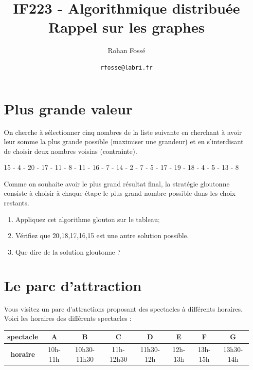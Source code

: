 \documentclass{article}[12pt]
\title{IF223 - Algorithmique distribuée\\ Rappel sur les graphes}
\date{\texttt{rfosse@labri.fr}}
\author{Rohan Fossé}
\begin{document}
\maketitle{}

\section*{Plus grande valeur}

On cherche à sélectionner cinq nombres de la liste suivante en cherchant à avoir leur somme la plus grande possible (maximiser une grandeur) et en s'interdisant de choisir deux nombres voisins (contrainte).\\

\begin{center}
  15 - 4 - 20 - 17 - 11 - 8 - 11 - 16 - 7 - 14 - 2 - 7 - 5 - 17 - 19 - 18 - 4 - 5 - 13 - 8\\  
\end{center}


Comme on souhaite avoir le plus grand résultat final, la stratégie gloutonne consiste à choisir à chaque étape le plus grand nombre possible dans les choix restants.
\begin{enumerate}
    \item Appliquez cet algorithme glouton sur le tableau;
    \item Vérifiez que {20,18,17,16,15} est une autre solution possible.
    \item Que dire de la solution gloutonne ?
\end{enumerate}


\section*{Le parc d'attraction}
    
Vous visitez un parc d'attractions proposant des spectacles à différents horaires. Voici les horaires des différents spectacles :

\begin{table}[h!]
\begin{tabular}{|c|c|c|c|c|c|c|c}
\hline
\textbf{spectacle} & \textbf{A} & \textbf{B}  & \textbf{C} & \textbf{D} & \textbf{E} & \textbf{F} & \textbf{G} \\ \hline
\textbf{horaire}   & 10h-11h    & 10h30-11h30 & 11h-12h30  & 11h30-12h  & 12h-13h    & 13h-15h    & 13h30-14h  \\ \hline
\end{tabular}
\end{table}
\end{document}
